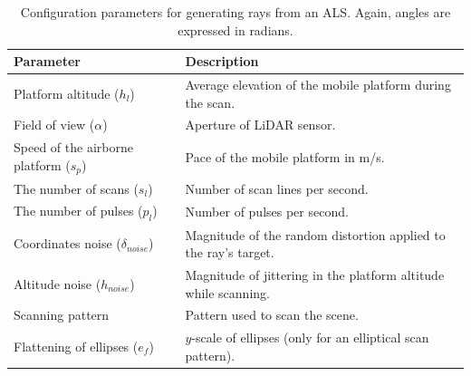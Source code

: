 \renewcommand{\arraystretch}{1.2}
\begin{table}
    \caption{Configuration parameters for generating rays from an ALS. Again, angles are expressed in radians.}
    \label{table:als_parameters}
    \centering
    \begin{tabular}{ll}
    \toprule
    \textbf{Parameter} & \textbf{Description} \\
    \midrule
    Platform altitude ($h_{l}$) & Average elevation of the mobile platform during the scan.\\
    Field of view ($\alpha$) & Aperture of LiDAR sensor. \\
    Speed of the airborne platform ($s_{p}$) & Pace of the mobile platform in \si{\meter/\second}. \\
    The number of scans ($s_{l}$) & Number of scan lines per second. \\
    The number of pulses ($p_{l}$) & Number of pulses per second. \\
    Coordinates noise ($\delta_{\textit{noise}}$) & Magnitude of the random distortion applied to the ray's target.\\
    Altitude noise ($h_{\textit{noise}}$) & Magnitude of jittering in the platform altitude while scanning.\\
    Scanning pattern & Pattern used to scan the scene. \\
    Flattening of ellipses ($e_{f}$) & $y$-scale of ellipses (only for an elliptical scan pattern). \\
    \bottomrule
    \end{tabular}
\end{table}
\renewcommand{\arraystretch}{1}

